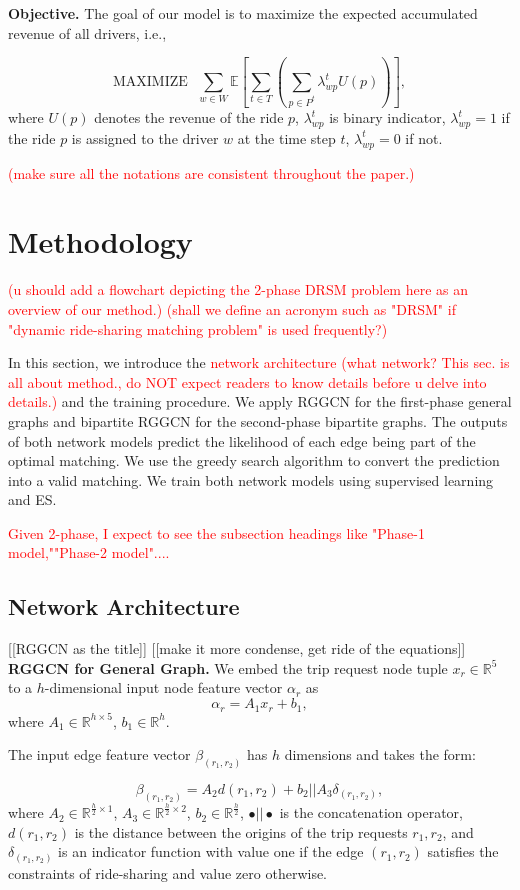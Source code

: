 \documentclass[sigconf]{acmart}
\newcommand{\tcr}[1]{{\textcolor{red}{#1}}}
\begin{document}
\textbf{Objective. }The goal of our model is to maximize the expected
accumulated revenue of all drivers, i.e., 

\[
\text{MAXIMIZE}\ \ \ \sum_{w\in W}\mathbb{E}[\sum_{t\in T}(\sum_{p\in P^{t}}\lambda_{wp}^{t}U(p))],
\]
where $U(p)$ denotes the revenue of the ride $p$, $\lambda_{wp}^{t}$
is binary indicator, $\lambda_{wp}^{t}=1$ if the ride $p$ is assigned
to the driver $w$ at the time step $t$, $\lambda_{wp}^{t}=0$ if
not.

\tcr{(make sure all the notations are consistent throughout the paper.)}

\section{Methodology}
\tcr{(u should add a flowchart depicting the 2-phase DRSM problem here as an overview of our method.)
(shall we define an acronym such as "DRSM" if "dynamic ride-sharing matching problem" is used frequently?)}

In this section, we introduce the \tcr{network architecture (what network? This sec. is all about method., do NOT expect readers to know details before u delve into details.)} and the training
procedure. We apply RGGCN for the first-phase general graphs and bipartite
RGGCN for the second-phase bipartite graphs. The outputs of both network
models predict the likelihood of each edge being part of the optimal
matching. We use the greedy search algorithm to convert the prediction
into a valid matching. We train both network models using supervised
learning and ES. 

\tcr{Given 2-phase, I expect to see the subsection headings like "Phase-1 model,""Phase-2 model"....}

\subsection{Network Architecture}
[[RGGCN as the title]]
[[make it more condense, get ride of the equations]]
\textbf{RGGCN for General Graph.} We embed the trip request node tuple
$x_{r}\in\mathbb{R}^{5}$ to a $h$-dimensional input node feature
vector $\alpha_{r}$ as 
\[
\alpha_{r}=A_{1}x_{r}+b_{1},
\]
where $A_{1}\in\mathbb{R}^{h\times5}$, $b_{1}\in\mathbb{R}^{h}$.

The input edge feature vector $\beta_{(r_{1},r_{2})}$ has $h$ dimensions
and takes the form:

\[
\beta_{(r_{1},r_{2})}=A_{2}d(r_{1},r_{2})+b_{2}||A_{3}\delta_{(r_{1},r_{2})},
\]
 where $A_{2}\in\mathbb{R}^{\frac{h}{2}\times1}$, $A_{3}\in\mathbb{R}^{\frac{h}{2}\times2}$,
$b_{2}\in\mathbb{R}^{\frac{h}{2}}$, $\bullet||\bullet$ is the concatenation
operator, $d(r_{1},r_{2})$ is the distance between the origins of
the trip requests $r_{1},r_{2}$, and $\delta_{\left(r_{1},r_{2}\right)}$
is an indicator function with value one if the edge $(r_{1},r_{2})$
satisfies the constraints of ride-sharing and value zero otherwise.
\end{document}
